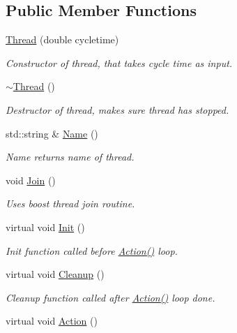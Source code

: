 \subsection*{Public Member Functions}
\begin{DoxyCompactItemize}
\item 
\hyperlink{classRCS_1_1Thread_a3f5e86f11c0b8fc3aa4728549b1b7249}{Thread} (double cycletime)
\begin{DoxyCompactList}\small\item\em Constructor of thread, that takes cycle time as input. \end{DoxyCompactList}\item 
\hyperlink{classRCS_1_1Thread_a7b91358afd5f9609b3a6b5b32f9a89aa}{$\sim$\-Thread} ()
\begin{DoxyCompactList}\small\item\em Destructor of thread, makes sure thread has stopped. \end{DoxyCompactList}\item 
std\-::string \& \hyperlink{classRCS_1_1Thread_a2db2a8e8dea3c4e502e8d6adbbf05724}{Name} ()
\begin{DoxyCompactList}\small\item\em Name returns name of thread. \end{DoxyCompactList}\item 
void \hyperlink{classRCS_1_1Thread_a5f7209d2edfa23588f6adc74bbfb8f07}{Join} ()
\begin{DoxyCompactList}\small\item\em Uses boost thread join routine. \end{DoxyCompactList}\item 
virtual void \hyperlink{classRCS_1_1Thread_a53ee19c04d064c9a23f0909cf9a4b2cc}{Init} ()
\begin{DoxyCompactList}\small\item\em Init function called before \hyperlink{classRCS_1_1Thread_a327655d2626c51ea61bcc233a94dc78e}{Action()} loop. \end{DoxyCompactList}\item 
virtual void \hyperlink{classRCS_1_1Thread_a8b932e4130f18d9747407fe70a87332a}{Cleanup} ()
\begin{DoxyCompactList}\small\item\em Cleanup function called after \hyperlink{classRCS_1_1Thread_a327655d2626c51ea61bcc233a94dc78e}{Action()} loop done. \end{DoxyCompactList}\item 
virtual void \hyperlink{classRCS_1_1Thread_a327655d2626c51ea61bcc233a94dc78e}{Action} ()

\end{DoxyCompactItemize}
